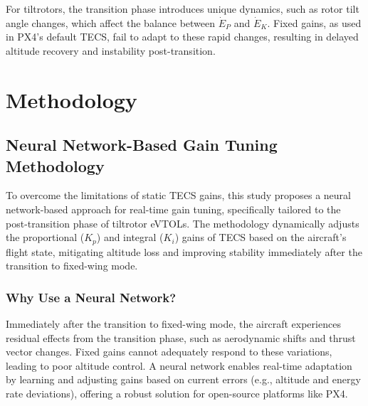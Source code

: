 \documentclass[journal,article,submit,pdftex,moreauthors]{Definitions/mdpi}
\begin{document}
For tiltrotors, the transition phase introduces unique dynamics, such as rotor tilt angle changes, which affect the balance between \(\dot{E}_P\) and \(\dot{E}_K\). Fixed gains, as used in PX4’s default TECS, fail to adapt to these rapid changes, resulting in delayed altitude recovery and instability post-transition.

\section{Methodology}
\subsection{Neural Network-Based Gain Tuning Methodology}
To overcome the limitations of static TECS gains, this study proposes a neural network-based approach for real-time gain tuning, specifically tailored to the post-transition phase of tiltrotor eVTOLs. The methodology dynamically adjusts the proportional (\(K_p\)) and integral (\(K_i\)) gains of TECS based on the aircraft’s flight state, mitigating altitude loss and improving stability immediately after the transition to fixed-wing mode.

\subsubsection{Why Use a Neural Network?}
Immediately after the transition to fixed-wing mode, the aircraft experiences residual effects from the transition phase, such as aerodynamic shifts and thrust vector changes. Fixed gains cannot adequately respond to these variations, leading to poor altitude control. A neural network enables real-time adaptation by learning and adjusting gains based on current errors (e.g., altitude and energy rate deviations), offering a robust solution for open-source platforms like PX4.
\end{document}
